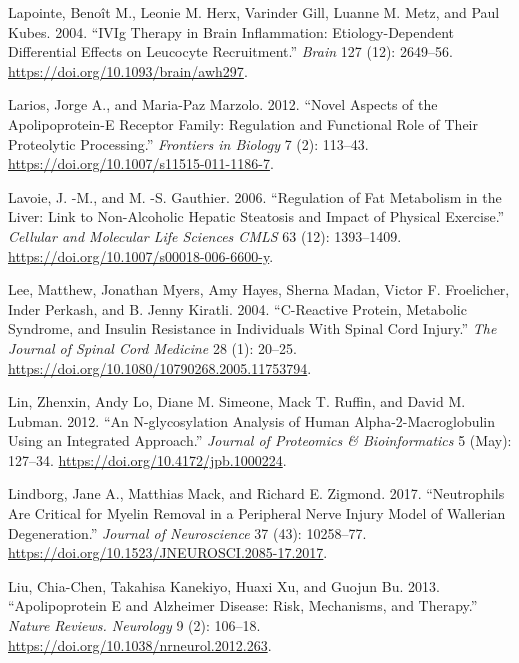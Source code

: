 \documentclass[9pt,lineno]{elife}
\newlength{\cslhangindent}
\newlength{\cslentryspacingunit} %
\newenvironment{CSLReferences}[2] %
 {%
  \setlength{\parindent}{0pt}
  \ifodd #1
  \let\oldpar\par
  \def\par{\hangindent=\cslhangindent\oldpar}
  \fi
  \setlength{\parskip}{#2\cslentryspacingunit}
 }%
 {}
\begin{document}
\begin{landscape}
\begin{landscape}
\begin{landscape}
\begin{landscape}
\begin{CSLReferences}{1}{0}
\leavevmode{}%
Lapointe, Benoît M., Leonie M. Herx, Varinder Gill, Luanne M. Metz, and Paul Kubes. 2004. {``{IVIg} Therapy in Brain Inflammation: Etiology-Dependent Differential Effects on Leucocyte Recruitment.''} \emph{Brain} 127 (12): 2649--56. \url{https://doi.org/10.1093/brain/awh297}.

\leavevmode{}%
Larios, Jorge A., and Maria-Paz Marzolo. 2012. {``Novel Aspects of the Apolipoprotein-{E} Receptor Family: Regulation and Functional Role of Their Proteolytic Processing.''} \emph{Frontiers in Biology} 7 (2): 113--43. \url{https://doi.org/10.1007/s11515-011-1186-7}.

\leavevmode{}%
Lavoie, J. -M., and M. -S. Gauthier. 2006. {``Regulation of Fat Metabolism in the Liver: Link to Non-Alcoholic Hepatic Steatosis and Impact of Physical Exercise.''} \emph{Cellular and Molecular Life Sciences CMLS} 63 (12): 1393--1409. \url{https://doi.org/10.1007/s00018-006-6600-y}.

\leavevmode{}%
Lee, Matthew, Jonathan Myers, Amy Hayes, Sherna Madan, Victor F. Froelicher, Inder Perkash, and B. Jenny Kiratli. 2004. {``C-{Reactive Protein}, {Metabolic Syndrome}, and {Insulin Resistance} in {Individuals With Spinal Cord Injury}.''} \emph{The Journal of Spinal Cord Medicine} 28 (1): 20--25. \url{https://doi.org/10.1080/10790268.2005.11753794}.

\leavevmode{}%
Lin, Zhenxin, Andy Lo, Diane M. Simeone, Mack T. Ruffin, and David M. Lubman. 2012. {``An {N-glycosylation Analysis} of {Human Alpha-2-Macroglobulin Using} an {Integrated Approach}.''} \emph{Journal of Proteomics \& Bioinformatics} 5 (May): 127--34. \url{https://doi.org/10.4172/jpb.1000224}.

\leavevmode{}%
Lindborg, Jane A., Matthias Mack, and Richard E. Zigmond. 2017. {``Neutrophils {Are Critical} for {Myelin Removal} in a {Peripheral Nerve Injury Model} of {Wallerian Degeneration}.''} \emph{Journal of Neuroscience} 37 (43): 10258--77. \url{https://doi.org/10.1523/JNEUROSCI.2085-17.2017}.

\leavevmode{}%
Liu, Chia-Chen, Takahisa Kanekiyo, Huaxi Xu, and Guojun Bu. 2013. {``Apolipoprotein {E} and {Alzheimer} Disease: Risk, Mechanisms, and Therapy.''} \emph{Nature Reviews. Neurology} 9 (2): 106--18. \url{https://doi.org/10.1038/nrneurol.2012.263}.


\end{CSLReferences}
\end{landscape}
\end{landscape}
\end{landscape}
\end{landscape}
\end{document}
